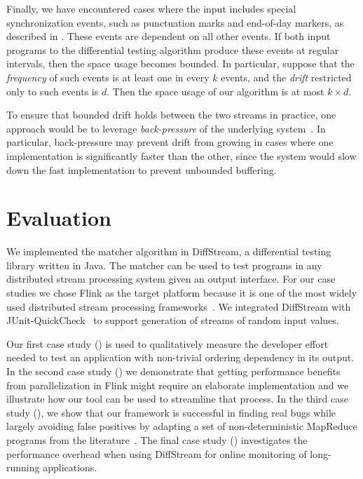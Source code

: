 Finally, we have encountered cases where the input includes special synchronization events, such as punctuation marks and end-of-day markers, as described in . These events are dependent on all other events. If both input programs to the differential testing algorithm produce these events at regular intervals, then the space usage becomes bounded. In particular, suppose that the \emph{frequency} of such events is at least one in every $k$ events, and the \emph{drift} restricted only to such events is $d$. Then the space usage of our algorithm is at most $k \times d$.

To ensure that bounded drift holds between the two streams in practice, one approach would be to leverage \emph{back-pressure} of the underlying system~\cite{collins2009flexible,kulkarni2015twitter-heron,chen2017governor}.
In particular, back-pressure may prevent drift from growing in cases where one implementation is significantly faster than the other, since the system would slow down the fast implementation to prevent unbounded buffering.

\section{Evaluation}
\label{diffstream:sec:evaluation}

We implemented the matcher algorithm in DiffStream, a differential
testing library written in Java. The matcher can be used to test
programs in any distributed stream processing system given an output
interface. For our case studies we chose Flink as the target platform
because it is one of the most widely used distributed stream
processing
frameworks~\cite{stackoverflow-flink}. We
integrated DiffStream with JUnit-QuickCheck~\cite{junit-quickcheck} to
support generation of streams of random input values.

Our first case study () is used to qualitatively measure the developer effort needed to test an application with non-trivial ordering dependency in its output. In the second case study () we demonstrate that getting performance benefits from parallelization in Flink might require an elaborate implementation and we illustrate how our tool can be used to streamline that process. In the third case study (), we show that our framework is successful in finding real bugs while largely avoiding false positives by adapting a set of non-deterministic MapReduce programs from the literature~\cite{xiao2014nondeterminism}. The final case study () investigates the performance overhead when using DiffStream{} for online monitoring of long-running applications.

